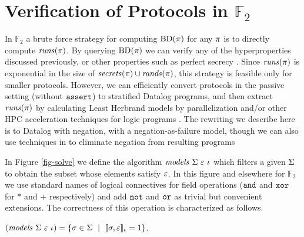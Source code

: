 \section{Verification of Protocols in $\mathbb{F}_2$}

In $\mathbb{F}_2$ a brute force strategy for computing
$\mathrm{BD}(\pi)$ for any $\pi$ is to directly compute
$\mathit{runs}(\pi)$. By querying $\mathrm{BD}(\pi)$ we can verify any of the
hyperproperties discussed previously, or other properties such as
perfect secrecy \cite{XXX}.  Since $\mathit{runs}(\pi)$ is exponential in
the size of $\mathit{secrets}(\pi) \cup \mathit{rands}(\pi)$, this strategy is
feasible only for smaller protocols. However, we can efficiently
convert protocols in the passive setting (without $\texttt{assert}$) to
stratified Datalog programs, and then extract $\mathit{runs}(\pi)$ by
calculating Least Herbrand models by parallelization and/or other HPC
acceleration techniques for logic programs \cite{aspis2018linear}.
The rewriting we describe here is to Datalog with negation, with a
negation-as-failure model, though we can also use techniques in
\cite{sakama2017linear} to eliminate negation from resulting programs

In Figure \ref{fig-solve} we define the algorithm
$\mathit{models}\ \Sigma\ \varepsilon\ \iota$ which filters a given $\Sigma$ to obtain the
subset whose elements satisfy $\varepsilon$. In this figure and elsewhere for
$\mathbb{F}_2$ we use standard names of logical connectives
for field operations ($\texttt{and}$ and $\texttt{xor}$ for $*$ and $+$ respectively) and
add $\texttt{not}$ and $\texttt{or}$ as trivial but convenient extensions. The correctness
of this operation is characterized as follows.
\begin{lemma}
  \label{lemma-solves}
  $(\mathit{models}\ \Sigma\ \varepsilon\ \iota) = \{ \sigma \in \Sigma \ \mid\ \llbracket \sigma,\varepsilon \rrbracket_{\iota} = 1 \}$.
\end{lemma}

\solvefig



